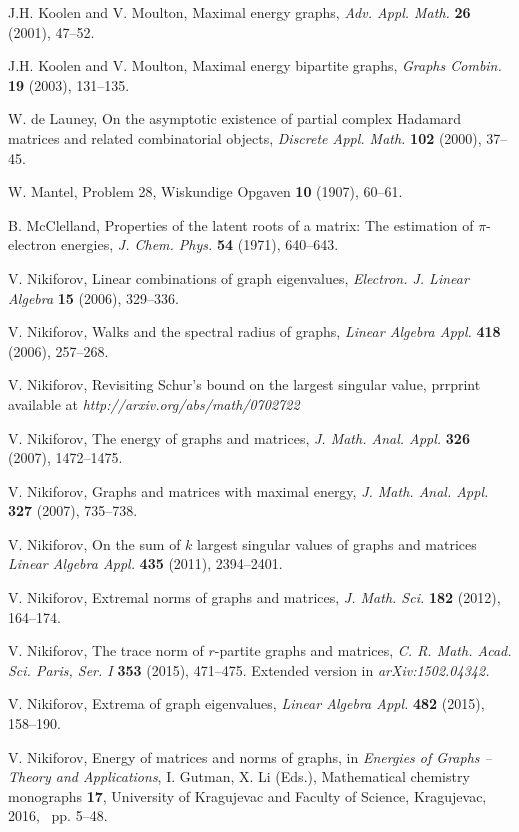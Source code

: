 \documentclass[12pt]{article}%
\begin{document}
\begin{thebibliography}{99}
J.H. Koolen and V. Moulton, Maximal energy graphs, \emph{Adv.
Appl. Math.}\textbf{ 26 }(2001), 47--52.

J.H. Koolen and V. Moulton, Maximal energy bipartite graphs,
\emph{Graphs Combin. }\textbf{19} (2003), 131--135.

W. de Launey, On the asymptotic existence of partial complex
Hadamard matrices and related combinatorial objects, \emph{Discrete Appl.
Math.} \textbf{102} (2000), 37--45.

W. Mantel, Problem 28, Wiskundige Opgaven \textbf{10 }(1907), 60--61.

B. McClelland, Properties of the latent roots of a matrix: The
estimation of $\pi$-electron energies, \emph{J. Chem. Phys.} \textbf{54}
(1971), 640--643.

V. Nikiforov, Linear combinations of graph eigenvalues,
\emph{Electron. J. Linear Algebra }\textbf{15} (2006), 329--336.

V. Nikiforov, Walks and the spectral radius of graphs,
\emph{Linear Algebra Appl.} \textbf{418} (2006), 257--268.

V. Nikiforov, Revisiting Schur's bound on the largest
singular value, prrprint available at \emph{http://arxiv.org/abs/math/0702722
}

V. Nikiforov, The energy of graphs and matrices, \emph{J.
Math. Anal. Appl.} \textbf{326} (2007), 1472--1475.

V. Nikiforov, Graphs and matrices with maximal energy,
\emph{J. Math. Anal. Appl. }\textbf{327} (2007), 735--738.

V. Nikiforov, On the sum of $k$ largest singular values of
graphs and matrices \emph{Linear Algebra Appl.} \textbf{435} (2011), 2394--2401.

V. Nikiforov, Extremal norms of graphs and matrices, \emph{J.
Math. Sci.} \textbf{182} (2012), 164--174.

V. Nikiforov, The trace norm of $r$-partite graphs and
matrices, \emph{C. R. Math. Acad. Sci. Paris, Ser. I }\textbf{353} (2015),
471--475. Extended version in \emph{arXiv:1502.04342.}

V. Nikiforov, Extrema of graph eigenvalues, \emph{Linear
Algebra Appl.}\textbf{ 482} (2015), 158--190.

V. Nikiforov, Energy of matrices and norms of graphs, in
\emph{Energies of Graphs -- Theory and Applications}, I. Gutman, X. Li (Eds.),
Mathematical chemistry monographs \textbf{17}, University of Kragujevac and
Faculty of Science, Kragujevac, 2016, \ pp. 5--48.


\end{thebibliography}
\end{document}
